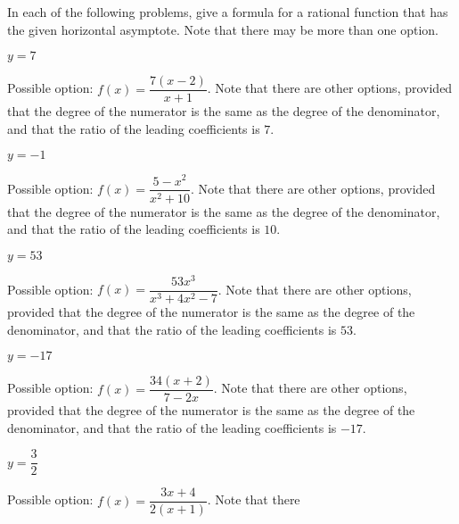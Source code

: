 \begin{exercises}
\begin{problem}
In each of the following problems, give a formula for a rational function that 
has the given horizontal asymptote. Note that there may be more than one option.
\begin{multicols}{4}
	\begin{subproblem}
		$y=7$ 
		\begin{shortsolution}
			Possible option: $f(x)=\dfrac{7(x-2)}{x+1}$. Note that there
			are other options, provided that the degree of the numerator is the same as the degree
			of the denominator, and that the ratio of the leading 
			coefficients is $7$.
		\end{shortsolution}
	\end{subproblem}
	\begin{subproblem}
		$y=-1$ 
		\begin{shortsolution}
			Possible option: $f(x)=\dfrac{5-x^2}{x^2+10}$. Note that there
			are other options, provided that the degree of the numerator is the same as the degree
			of the denominator, and that the ratio of the leading 
			coefficients is $10$.
		\end{shortsolution}
	\end{subproblem}
	\begin{subproblem}
		$y=53$ 
		\begin{shortsolution}
			Possible option: $f(x)=\dfrac{53x^3}{x^3+4x^2-7}$. Note that there
			are other options, provided that the degree of the numerator is the same as the degree
			of the denominator, and that the ratio of the leading 
			coefficients is $53$.
		\end{shortsolution}
	\end{subproblem}
	\begin{subproblem}
		$y=-17$ 
		\begin{shortsolution}
			Possible option: $f(x)=\dfrac{34(x+2)}{7-2x}$. Note that there
			are other options, provided that the degree of the numerator is the same as the degree
			of the denominator, and that the ratio of the leading 
			coefficients is $-17$.
		\end{shortsolution}
	\end{subproblem}
	\begin{subproblem}
		$y=\dfrac{3}{2}$ 
		\begin{shortsolution}
			Possible option: $f(x)=\dfrac{3x+4}{2(x+1)}$. Note that there

\end{shortsolution}
\end{subproblem}
\end{multicols}
\end{problem}
\end{exercises}
